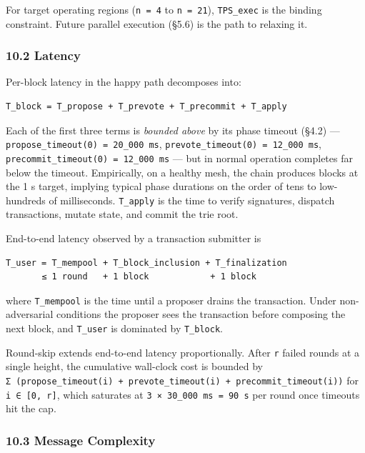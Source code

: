 \documentclass[11pt,a4paper]{article}
\begin{document}
For target operating regions (\texttt{n\ =\ 4} to \texttt{n\ =\ 21}),
\texttt{TPS\_exec} is the binding constraint. Future parallel execution
(§5.6) is the path to relaxing it.

\hypertarget{102-latency}{%
\subsubsection{10.2 Latency}\label{102-latency}}

Per-block latency in the happy path decomposes into:

\begin{verbatim}
T_block = T_propose + T_prevote + T_precommit + T_apply
\end{verbatim}

Each of the first three terms is \emph{bounded above} by its phase
timeout (§4.2) --- \texttt{propose\_timeout(0)\ =\ 20\_000\ ms},
\texttt{prevote\_timeout(0)\ =\ 12\_000\ ms},
\texttt{precommit\_timeout(0)\ =\ 12\_000\ ms} --- but in normal
operation completes far below the timeout. Empirically, on a healthy
mesh, the chain produces blocks at the 1 s target, implying typical
phase durations on the order of tens to low-hundreds of milliseconds.
\texttt{T\_apply} is the time to verify signatures, dispatch
transactions, mutate state, and commit the trie root.

End-to-end latency observed by a transaction submitter is

\begin{verbatim}
T_user = T_mempool + T_block_inclusion + T_finalization
       ≤ 1 round   + 1 block            + 1 block
\end{verbatim}

where \texttt{T\_mempool} is the time until a proposer drains the
transaction. Under non-adversarial conditions the proposer sees the
transaction before composing the next block, and \texttt{T\_user} is
dominated by \texttt{T\_block}.

Round-skip extends end-to-end latency proportionally. After \texttt{r}
failed rounds at a single height, the cumulative wall-clock cost is
bounded by
\texttt{Σ\ (propose\_timeout(i)\ +\ prevote\_timeout(i)\ +\ precommit\_timeout(i))}
for \texttt{i\ ∈\ {[}0,\ r{]}}, which saturates at
\texttt{3\ ×\ 30\_000\ ms\ =\ 90\ s} per round once timeouts hit the
cap.

\hypertarget{103-message-complexity}{%
\subsubsection{10.3 Message Complexity}\label{103-message-complexity}}
\end{document}
